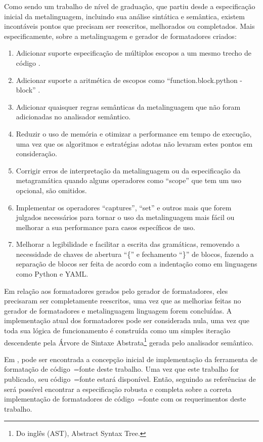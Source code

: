 Como sendo um trabalho de nível de graduação,
que partiu desde a especificação inicial da metalinguagem,
incluindo sua análise sintática e
semântica,
existem incontáveis pontos que precisam ser reescritos,
melhorados ou completados. Mais especificamente,
sobre a metalinguagem e
gerador de formatadores criados:
\begin{enumerate}
\item Adicionar suporte especificação de múltiplos escopos a um mesmo trecho de código \cite{vsCodeSyntaxHighlighthing}.
\item Adicionar suporte a aritmética de escopos como ``function.block.python - block'' \cite{textMateScopeExclusion}.
\item Adicionar quaisquer regras semânticas da metalinguagem que não foram adicionadas no analisador semântico.
\item Reduzir o uso de memória e
otimizar a performance em tempo de execução,
uma vez que os algoritmos e
estratégias adotas não levaram estes pontos em consideração.
\item Corrigir erros de interpretação da metalinguagem ou
da especificação da metagramática quando alguns operadores como ``scope'' que tem um uso opcional,
são omitidos.
\item Implementar os operadores ``captures'',
``set'' e
outros mais que forem julgados necessários para tornar o uso da metalinguagem mais fácil ou
melhorar a sua performance para casos específicos de uso.
\item Melhorar a legibilidade e
facilitar a escrita das gramáticas,
removendo a necessidade de chaves de abertura ``\{'' e
fechamento ``\}'' de blocos,
fazendo a separação de blocos ser feita de acordo com a indentação como em linguagens como Python e
YAML.
\end{enumerate}%

Em relação aos formatadores gerados pelo gerador de formatadores,
eles precisaram ser completamente reescritos,
uma vez que as melhorias feitas no gerador de formatadores e
metalinguagem linguagem forem concluídas.
A implementação atual dos formatadores pode ser considerada nula,
uma vez que toda sua lógica de funcionamento é construída como um simples iteração descendente pela Árvore de Sintaxe Abstrata\footnote{%
Do inglês (AST), Abstract Syntax Tree.
} \cite{ahoCompilerDragonBook} gerada pelo analisador semântico.

Em ,
pode ser encontrada a concepção inicial de implementação da ferramenta de formatação de código~=fonte deste trabalho.
Uma vez que este trabalho for publicado,
seu código~=fonte estará disponível.
Então,
seguindo as referências de  será possível encontrar a especificação robusta e
completa sobre a correta implementação de formatadores de código~=fonte com os requerimentos deste trabalho.

